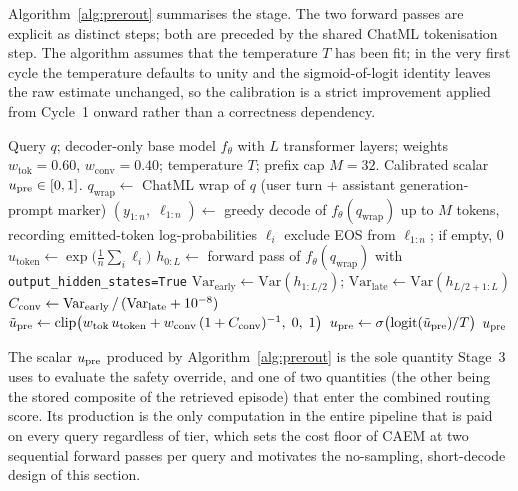 Algorithm~\ref{alg:prerout} summarises the stage. The two forward passes are explicit as distinct steps; both are preceded by the shared ChatML tokenisation step. The algorithm assumes that the temperature $T$ has been fit; in the very first cycle the temperature defaults to unity and the sigmoid-of-logit identity leaves the raw estimate unchanged, so the calibration is a strict improvement applied from Cycle~1 onward rather than a correctness dependency.

\begin{algorithm}
\caption{Stage~1 pre-route confidence $\upre$.}
\label{alg:prerout}
\begin{algorithmic}[1]
\Require Query $q$; decoder-only base model $f_{\theta}$ with $L$ transformer layers; weights $w_{\text{tok}} = 0.60$, $w_{\text{conv}} = 0.40$; temperature $T$; prefix cap $M = 32$.
\Ensure Calibrated scalar $u_{\text{pre}} \in [0,1]$.
\State $q_{\text{wrap}} \gets$ ChatML wrap of $q$ (user turn + assistant generation-prompt marker)
\State {}
\State $(y_{1{:}n},\; \ell_{1{:}n}) \gets$ greedy decode of $f_{\theta}(q_{\text{wrap}})$ up to $M$ tokens, recording emitted-token log-probabilities $\ell_{i}$
\State exclude EOS from $\ell_{1{:}n}$; if empty, \Return $0$ 
\State $u_{\text{token}} \gets \exp\bigl(\tfrac{1}{n}\sum_{i}\ell_{i}\bigr)$ 
\State {}
\State $h_{0{:}L} \gets$ forward pass of $f_{\theta}(q_{\text{wrap}})$ with \texttt{output\_hidden\_states=True}
\State $\mathrm{Var}_{\text{early}} \gets \mathrm{Var}(h_{1{:}L/2})$; \; $\mathrm{Var}_{\text{late}} \gets \mathrm{Var}(h_{L/2+1{:}L})$ 
\State $C_{\text{conv}} \gets \mathrm{Var}_{\text{early}} \,/\, (\mathrm{Var}_{\text{late}} + 10^{-8})$
\State $\tilde{u}_{\text{pre}} \gets \mathrm{clip}\bigl(w_{\text{tok}}\, u_{\text{token}} + w_{\text{conv}}\,(1 + C_{\text{conv}})^{-1},\; 0,\; 1\bigr)$
\State $u_{\text{pre}} \gets \sigma\bigl(\mathrm{logit}(\tilde{u}_{\text{pre}}) / T\bigr)$ 
\State \Return $\upre$
\end{algorithmic}
\end{algorithm}

The scalar $\upre$ produced by Algorithm~\ref{alg:prerout} is the sole quantity Stage~3 uses to evaluate the safety override, and one of two quantities (the other being the stored composite of the retrieved episode) that enter the combined routing score. Its production is the only computation in the entire pipeline that is paid on every query regardless of tier, which sets the cost floor of CAEM at two sequential forward passes per query and motivates the no-sampling, short-decode design of this section.

